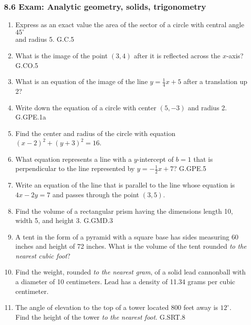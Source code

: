 \documentclass[12pt, twoside]{article}
\begin{document}
\subsubsection*{8.6 Exam: Analytic geometry, solids, trigonometry}
\begin{enumerate}[itemsep=2cm]
\item Express as an exact value the area of the sector of a circle with central angle $45^\circ$ \\and radius 5. \hfill G.C.5

\item What is the image of the point $(3,4)$ after it is reflected across the $x$-axis? \hfill G.CO.5

\item What is an equation of the image of the line $\displaystyle y=\frac{1}{4}x+5$ after a translation up 2?

\item Write down the equation of a circle with center $(5,-3)$ and radius 2. \hfill G.GPE.1a

\item Find the center and radius of the circle with equation $(x-2)^2+(y+3)^2=16$.

\item What equation represents a line with a $y$-intercept of $b=1$ that is perpendicular to the line represented by $\displaystyle y=-\frac{1}{2}x+7$? \hfill G.GPE.5

\item Write an equation of the line that is parallel to the line whose equation is $4x-2y=7$ and passes through the point $(3,5)$. \vspace{1cm}

\newpage
\item Find the volume of a rectangular prism having the dimensions length 10, width 5, and height 3. \hfill G.GMD.3 

\item A tent in the form of a pyramid with a square base has sides measuring 60 inches and height of 72 inches. What is the volume of the tent rounded \emph{to the nearest cubic foot}? \vspace{2cm}

\item Find the weight, rounded \emph{to the nearest gram}, of a solid lead cannonball with a diameter of 10 centimeters. Lead has a density of 11.34 grams per cubic centimeter. \vspace{3cm}

\item The angle of elevation to the top of a tower located 800 feet away is $12^\circ$. \\Find the height of the tower \emph{to the nearest foot}. \hfill G.SRT.8



\end{enumerate}
\end{document}
